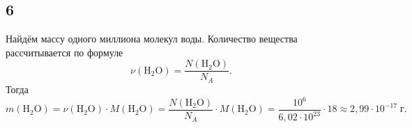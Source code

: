\subsection{6}

Найдём массу одного миллиона молекул воды. Количество вещества рассчитывается по формуле
\[
\nu(\mathrm{H_2O})=\frac{N(\mathrm{H_2O})}{N_A}.
\]
Тогда
\[
m(\mathrm{H_2O})=\nu(\mathrm{H_2O})\cdot M(\mathrm{H_2O})=\frac{N(\mathrm{H_2O})}{N_A}\cdot M(\mathrm{H_2O})=\frac{10^6}{6{,}02\cdot10^{23}}\cdot 18\approx2{,}99\cdot10^{-17}\;\text{г}.
\]